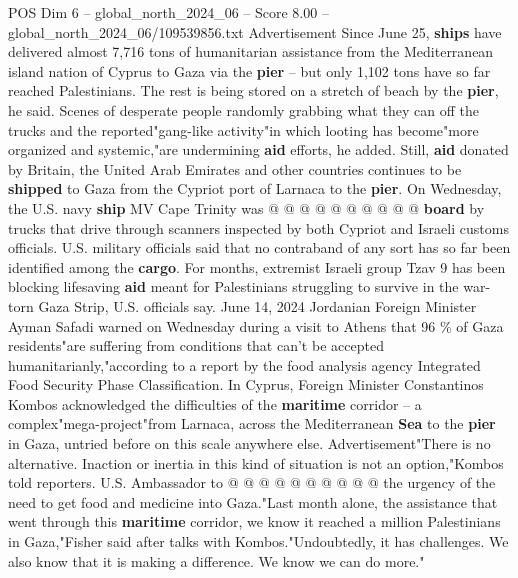\begin{textsample}{POS Dim 6 – global\_north\_2024\_06 – Score 8.00 – global\_north\_2024\_06/109539856.txt}
Advertisement Since June 25, \textbf{ships} have delivered almost 7,716 tons of humanitarian assistance from the Mediterranean island nation of Cyprus to Gaza via the \textbf{pier} -- but only 1,102 tons have so far reached Palestinians.
The rest is being stored on a stretch of beach by the \textbf{pier}, he said.
Scenes of desperate people randomly grabbing what they can off the trucks and the reported"gang-like activity"in which looting has become"more organized and systemic,"are undermining \textbf{aid} efforts, he added.
Still, \textbf{aid} donated by Britain, the United Arab Emirates and other countries continues to be \textbf{shipped} to Gaza from the Cypriot port of Larnaca to the \textbf{pier}.
On Wednesday, the U.S. navy \textbf{ship} MV Cape Trinity was @ @ @ @ @ @ @ @ @ @ \textbf{board} by trucks that drive through scanners inspected by both Cypriot and Israeli customs officials.
U.S. military officials said that no contraband of any sort has so far been identified among the \textbf{cargo}.
For months, extremist Israeli group Tzav 9 has been blocking lifesaving \textbf{aid} meant for Palestinians struggling to survive in the war-torn Gaza Strip, U.S. officials say.
June 14, 2024 Jordanian Foreign Minister Ayman Safadi warned on Wednesday during a visit to Athens that 96 \% of Gaza residents"are suffering from conditions that can't be accepted humanitarianly,"according to a report by the food analysis agency Integrated Food Security Phase Classification.
In Cyprus, Foreign Minister Constantinos Kombos acknowledged the difficulties of the \textbf{maritime} corridor -- a complex"mega-project"from Larnaca, across the Mediterranean \textbf{Sea} to the \textbf{pier} in Gaza, untried before on this scale anywhere else.
Advertisement"There is no alternative.
Inaction or inertia in this kind of situation is not an option,"Kombos told reporters.
U.S.
Ambassador to @ @ @ @ @ @ @ @ @ @ the urgency of the need to get food and medicine into Gaza."Last month alone, the assistance that went through this \textbf{maritime} corridor, we know it reached a million Palestinians in Gaza,"Fisher said after talks with Kombos."Undoubtedly, it has challenges.
We also know that it is making a difference.
We know we can do more."

\end{textsample}
